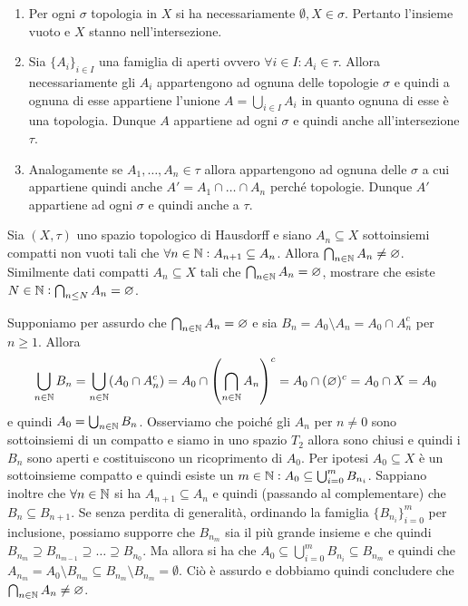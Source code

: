 \documentclass[a4paper]{article}\par \usepackage{style}\par
\begin{document}
\begin{enumerate}[label = (\roman*)]
\item Per ogni $ \sigma $ topologia in $ X $ si ha necessariamente $ \emptyset, X \in \sigma $. Pertanto l'insieme vuoto e $ X $ stanno nell'intersezione.
\item Sia $ \{A_i\}_{i \in I} $ una famiglia di aperti ovvero $ \forall i \in I : A_{i} \in \tau $. Allora necessariamente gli $ A_i $ appartengono ad ognuna delle topologie $ \sigma $ e quindi a ognuna di esse appartiene l'unione $ A = \bigcup_{i \in I} A_i $ in quanto ognuna di esse è una topologia. Dunque $ A $ appartiene ad ogni $ \sigma $ e quindi anche all'intersezione $ \tau $.
\item Analogamente se $ A_1, \ldots, A_n \in \tau $ allora appartengono ad ognuna delle $ \sigma $ a cui appartiene quindi anche $ A' = A_1 \cap \ldots \cap A_n $ perché topologie. Dunque $ A' $ appartiene ad ogni $ \sigma $ e quindi anche a $ \tau $.
\end{enumerate}\par \begin{es}
  Sia $ (X, \tau) $ uno spazio topologico di Hausdorff e siano $ A_n \subseteq X $ sottoinsiemi compatti non vuoti tali che $ \forall n \in \mathbb{N} : A_{n + 1} \subseteq A_n $. Allora $ \bigcap_{n \in \mathbb{N}} A_n \neq \varnothing $. \\
  Similmente dati compatti $ A_n \subseteq X $ tali che $ \bigcap_{n \in \mathbb{N}} A_n = \varnothing $, mostrare che esiste $ N \in \mathbb{N} : \bigcap_{n \leq N} A_n = \varnothing $.
\end{es}\par 
Supponiamo per assurdo che $ \bigcap_{n \in \mathbb{N}} A_n = \varnothing $ e sia $ B_n = A_0 \setminus A_n = A_0 \cap A_n^c $ per $ n \geq 1 $. Allora \[\bigcup_{n \in \mathbb{N}} B_n = \bigcup_{n \in \mathbb{N}} (A_0 \cap A_n^c) = A_0 \cap \left(\bigcap_{n \in \mathbb{N}} A_n\right)^c = A_0 \cap (\varnothing)^c = A_0 \cap X = A_0\] e quindi $ A_0 = \bigcup_{n \in \mathbb{N}} B_n $. Osserviamo che poiché gli $ A_n $ per $ n \neq 0 $ sono sottoinsiemi di un compatto e siamo in uno spazio $ T_2 $ allora sono chiusi e quindi i $ B_n $ sono aperti e costituiscono un ricoprimento di $ A_0 $. Per ipotesi $ A_0 \subseteq X $ è un sottoinsieme compatto e quindi esiste un $ m \in \mathbb{N} : A_0 \subseteq \bigcup_{i = 0}^{m} B_{n_{i}} $. Sappiano inoltre che $ \forall n \in \mathbb{N} $ si ha $ A_{n + 1} \subseteq A_n $ e quindi (passando al complementare) che $ B_{n} \subseteq B_{n + 1} $. Se senza perdita di generalità, ordinando la famiglia $ \{B_{n_i}\}_{i = 0}^{m} $ per inclusione, possiamo supporre che $ B_{n_m} $ sia il più grande insieme e che quindi $ B_{n_m} \supseteq B_{n_{m - 1}} \supseteq \ldots \supseteq B_{n_0} $. Ma allora si ha che $ A_0 \subseteq \bigcup_{i = 0}^{m} B_{n_{i}} \subseteq B_{n_m} $ e quindi che $ A_{n_m} = A_0 \setminus B_{n_m} \subseteq B_{n_m} \setminus B_{n_m} = \emptyset $. Ciò è assurdo e dobbiamo quindi concludere che $ \bigcap_{n \in \mathbb{N}} A_n \neq \varnothing $. \\
\end{document}
